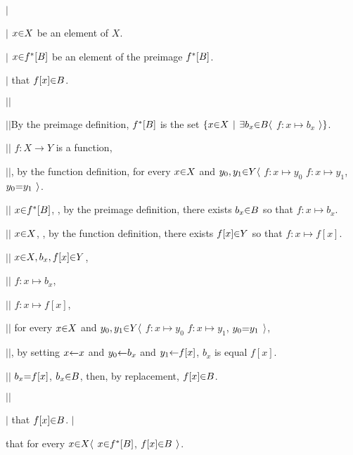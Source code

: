   $|$\hs \par
  $|$\hs {} $x \p\in X$ be an element of $X$. \par
  $|$\hs {} $x \p\in f^*[\b B]$ be an element of the preimage $f^*[\b B]$. \par
  $|$\hs {} that $f[x] \p\in \b B$. \par

    $|$\hs$|$\hs \par
    $|$\hs$|$\hs By the preimage definition, $f^*[\b B]$ is the set $\a\{x \p\in X \pipe \a\exists b_x \p\in \b B \a\langle$ $f: x \mapsto b_x$ $\a\rangle \a\}$. \par
    $|$\hs$|$\hs {} $f:X \to Y$ is a function, \par
    $|$\hs$|$\hs {}, by the function definition, for every $x \p\in X$ and $y_0,y_1 \p\in Y \a\langle$  $f: x \mapsto y_0$  $f: x \mapsto y_1$,  $y_0 \p= y_1$ $\a\rangle$. \par
    $|$\hs$|$\hs {} $x \p\in f^*[\b B]$, , by the preimage definition, there exists $b_x  \p\in \b B$ so that $f: x \mapsto b_x$. \par
    $|$\hs$|$\hs {} $x \p\in X$,         , by the function definition, there exists $f[x] \p\in Y$    so that $f: x \mapsto f[x]$. \par
    $|$\hs$|$\hs {} $x \p\in X, b_x,f[x] \p\in Y$, \par
    $|$\hs$|$\hs {}   $f: x \mapsto b_x$, \par
    $|$\hs$|$\hs {}   $f: x \mapsto f[x]$, \par
    $|$\hs$|$\hs {}   for every $x \p\in X$ and $y_0,y_1 \p\in Y \a\langle$  $f: x \mapsto y_0$  $f: x \mapsto y_1$,  $y_0 \p= y_1$ $\a\rangle$, \par
    $|$\hs$|$\hs {}, by setting $x \p\leftarrow x$ and $y_0 \p\leftarrow b_x$ and $y_1 \p\leftarrow f[x]$, $b_x$ is equal $f[x]$. \par
    $|$\hs$|$\hs {} $b_x \p= f[x]$,  $b_x \p\in \b B$, then, by replacement, $f[x] \p\in \b B$. \par
    $|$\hs$|$\hs \par

  $|$\hs {} that $f[x] \p\in \b B$.
  $|$\hs \par

 that for every $x \p\in X \a\langle$  $x \p\in f^*[\b B]$,  $f[x] \p\in \b B$ $\a\rangle$. \par
\fi

